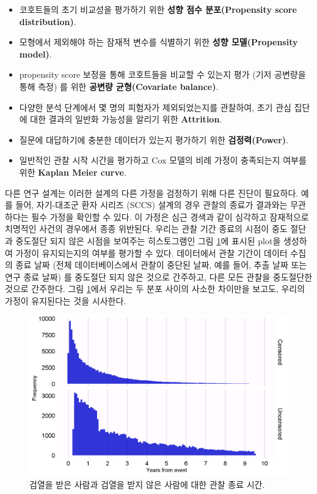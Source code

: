 \documentclass[11pt]{book}
\providecommand{\tightlist}{%
  \setlength{\itemsep}{0pt}\setlength{\parskip}{0pt}}
\theoremstyle{definition}
\theoremstyle{definition}
\theoremstyle{definition}
\theoremstyle{remark}
\begin{document}
\begin{itemize}
\tightlist
\item
  코호트들의 초기 비교성을 평가하기 위한 \textbf{성향 점수
  분포(Propensity score distribution)}.
\item
  모형에서 제외해야 하는 잠재적 변수를 식별하기 위한 \textbf{성향
  모델(Propensity model)}.
\item
  propensity score 보정을 통해 코호트들을 비교할 수 있는지 평가 (기저
  공변량을 통해 측정) 를 위한 \textbf{공변량 균형(Covariate balance)}.
\item
  다양한 분석 단계에서 몇 명의 피험자가 제외되었는지를 관찰하여, 초기
  관심 집단에 대한 결과의 일반화 가능성을 알리기 위한
  \textbf{Attrition}.
\item
  질문에 대답하기에 충분한 데이터가 있는지 평가하기 위한
  \textbf{검정력(Power)}.
\item
  일반적인 관찰 시작 시간을 평가하고 Cox 모델의 비례 가정이 충족되는지
  여부를 위한 \textbf{Kaplan Meier curve}.
\end{itemize}

다른 연구 설계는 이러한 설계의 다른 가정을 검정하기 위해 다른 진단이
필요하다. 예를 들어, 자기-대조군 환자 시리즈 (SCCS) 설계의 경우 관찰의
종료가 결과와는 무관하다는 필수 가정을 확인할 수 있다. 이 가정은 심근
경색과 같이 심각하고 잠재적으로 치명적인 사건의 경우에서 종종 위반된다.
우리는 관찰 기간 종료의 시점이 중도 절단과 중도절단 되지 않은 시점을
보여주는 히스토그램인 그림 \ref{fig:timeToObsEnd}에 표시된 plot을
생성하여 가정이 유지되는지의 여부를 평가할 수 있다. 데이터에서 관찰
기간이 데이터 수집의 종료 날짜 (전체 데이터베이스에서 관찰이 중단된
날짜, 예를 들어, 추출 날짜 또는 연구 종료 날짜) 를 중도절단 되지 않은
것으로 간주하고, 다른 모든 관찰을 중도절단한 것으로 간주한다. 그림
\ref{fig:timeToObsEnd}에서 우리는 두 분포 사이의 사소한 차이만을 보고도,
우리의 가정이 유지된다는 것을 시사한다.

\begin{figure}

{\centering \includegraphics[width=1\linewidth]{images/MethodValidity/timeToObsEnd} 

}

\caption{검열을 받은 사람과 검열을 받지 않은 사람에 대한 관찰 종료 시간.}\label{fig:timeToObsEnd}
\end{figure}
\end{document}
